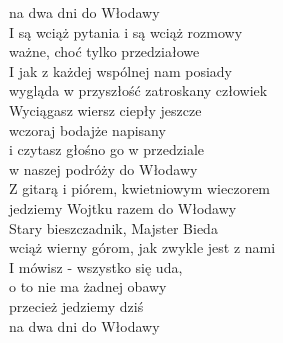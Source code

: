 na dwa dni do Włodawy  \\
\hops
I są wciąż pytania i są wciąż rozmowy  \\
ważne, choć tylko przedziałowe  \\
I jak z każdej wspólnej nam posiady  \\
wygląda w przyszłość zatroskany człowiek  \\
Wyciągasz wiersz ciepły jeszcze  \\
wczoraj bodajże napisany  \\
i czytasz głośno go w przedziale  \\
w naszej podróży do Włodawy  \\
\hops
Z gitarą i piórem, kwietniowym wieczorem \\
jedziemy Wojtku razem do Włodawy \\
Stary bieszczadnik, Majster Bieda \\
wciąż wierny górom, jak zwykle jest z nami  \\
I mówisz - wszystko się uda, \\
o to nie ma żadnej obawy \\
przecież jedziemy dziś  \\
na dwa dni do Włodawy